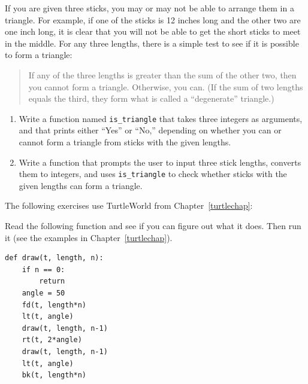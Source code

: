 \documentclass[10pt]{book}
\begin{document}
\begin{exercise}

If you are given three sticks, you may or may not be able to arrange
them in a triangle.  For example, if one of the sticks is 12 inches
long and the other two are one inch long, it is clear that you will
not be able to get the short sticks to meet in the middle.  For any
three lengths, there is a simple test to see if it is possible to form
a triangle:

\begin{quotation}
If any of the three lengths is greater than the sum of the other
  two, then you cannot form a triangle.  Otherwise, you
  can.  (If the sum of two lengths equals the third, they form
    what is called a ``degenerate'' triangle.)
\end{quotation}

\begin{enumerate}

\item Write a function named \verb"is_triangle" that takes three
  integers as arguments, and that prints either ``Yes'' or ``No,'' depending
  on whether you can or cannot form a triangle from sticks with the
  given lengths.

\item Write a function that prompts the user to input three stick
  lengths, converts them to integers, and uses \verb"is_triangle" to
  check whether sticks with the given lengths can form a triangle.

\end{enumerate}

\end{exercise}

The following exercises use TurtleWorld from Chapter~\ref{turtlechap}:

\begin{exercise}

Read the following function and see if you can figure out
what it does.  Then run it (see the examples in Chapter~\ref{turtlechap}).

\begin{verbatim}
def draw(t, length, n):
    if n == 0:
        return
    angle = 50
    fd(t, length*n)
    lt(t, angle)
    draw(t, length, n-1)
    rt(t, 2*angle)
    draw(t, length, n-1)
    lt(t, angle)
    bk(t, length*n)
\end{verbatim}

\end{exercise}
\end{document}
